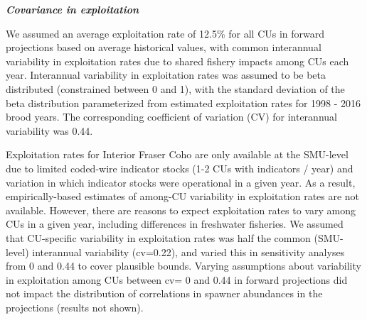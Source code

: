 \documentclass[11pt]{book}
\begin{document}
\textbf{\emph{Covariance in exploitation}}

We assumed an average exploitation rate of 12.5\% for all CUs in forward projections based on average historical values, with common interannual variability in exploitation rates due to shared fishery impacts among CUs each year. Interannual variability in exploitation rates was assumed to be beta distributed (constrained between 0 and 1), with the standard deviation of the beta distribution parameterized from estimated exploitation rates for 1998 - 2016 brood years. The corresponding coefficient of variation (CV) for interannual variability was 0.44.

Exploitation rates for Interior Fraser Coho are only available at the SMU-level due to limited coded-wire indicator stocks (1-2 CUs with indicators / year) and variation in which indicator stocks were operational in a given year. As a result, empirically-based estimates of among-CU variability in exploitation rates are not available. However, there are reasons to expect exploitation rates to vary among CUs in a given year, including differences in freshwater fisheries. We assumed that CU-specific variability in exploitation rates was half the common (SMU-level) interannual variability (cv=0.22), and varied this in sensitivity analyses from 0 and 0.44 to cover plausible bounds. Varying assumptions about variability in exploitation among CUs between cv= 0 and 0.44 in forward projections did not impact the distribution of correlations in spawner abundances in the projections (results not shown).
\end{document}
